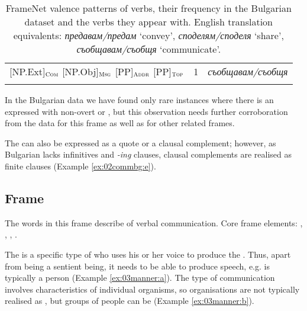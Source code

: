 \documentclass[output=paper,colorlinks,citecolor=brown]{langscibook}
\begin{document}
\begin{table}
\begin{tabularx}{\textwidth}{lrQ}
{[NP.Ext]}$_{\text{\textsc{Com}}}$ {[NP.Obj]}$_{\text{\textsc{Msg}}}$ {[PP]}$_{\text{\textsc{Addr}}}$ {[PP]}$_{\text{\textsc{Top}}}$ & 1 & \textit{съобщавам\slash съобщя}\\
\lspbottomrule
\end{tabularx}
    \caption{FrameNet valence patterns of  verbs, their frequency in the Bulgarian dataset and the verbs they appear with. 
    English translation equivalents: \textit{предавам\slash предам} `convey', \textit{споделям\slash споделя} `share', \textit{съобщавам\slash съобщя} `communicate'.}
    \label{tbl:communication-valence-bg}
\end{table} 

In the Bulgarian data we have found only rare instances where there is an expressed  with non-overt  or , but this observation needs further corroboration from the data for this frame as well as for other related frames.

The  can also be expressed as a quote or a clausal complement; however, as Bulgarian lacks infinitives and \textit{-ing} clauses, clausal complements are realised as finite clauses (Example \ref{ex:02commbg:e}). 




\subsection{Frame }

\begin{description}[font=\normalfont]\sloppy
\item[Definition of the frame \framename{Communication\_manner}:] The words in this frame describe  of verbal communication. Core frame elements: , , , .
\end{description}

The  is a specific type of  who uses his or her voice to produce the . Thus, apart from being a sentient being, it needs to be able to produce speech, e.g. is typically a person (Example \ref{ex:03manner:a}). The type of communication involves characteristics of individual organisms, so organisations are not typically realised as , but groups of people can be (Example \ref{ex:03manner:b}).  
\end{document}
